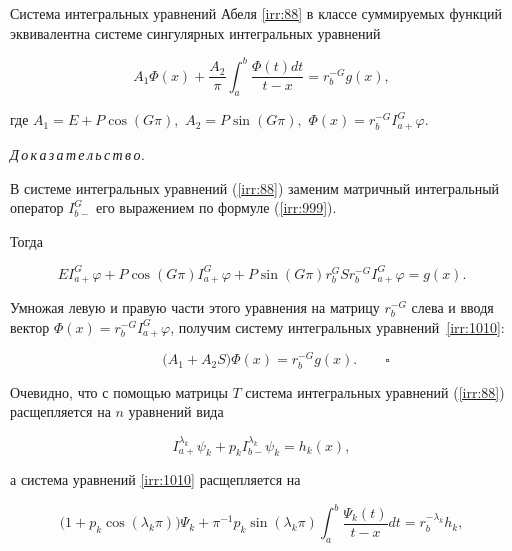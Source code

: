 \smallskip



\begin{lemma}[2]Система интегральных уравнений Абеля \eqref{irr:88} в классе суммируемых функций эквивалентна системе сингулярных интегральных уравнений

\begin{equation}\label{irr:1010}

A_{1}\Phi(x)+\frac{A_{2}}{\pi}\int _{a}^{b}\frac{\Phi(t)dt}{t-x}=r_b^{-G}g(x),

\end{equation}

где $A_{1}=E+P\cos(G\pi),$ $A_{2}=P\sin(G\pi),$ $\Phi(x)=r_b^{-G}I_{a+}^{G}\varphi$.

\end{lemma}



{\it Д\,о\,к\,а\,з\,а\,т\,е\,л\,ь\,с\,т\,в\,о.}

В системе интегральных уравнений (\ref{irr:88}) заменим матричный интегральный оператор $I_{b-}^{G}$ его выражением по формуле (\ref{irr:999}).

Тогда

$$EI_{a+}^{G}\varphi+P\cos(G\pi)I_{a+}^{G}\varphi+P\sin(G\pi)r_{b}^{G}Sr_{b}^{-G}I_{a+}^{G}\varphi=g(x).$$

Умножая левую и правую части этого уравнения на матрицу $r_{b}^{-G}$ слева и вводя вектор $\Phi(x)=r_{b}^{-G}I_{a+}^{G}\varphi$, получим систему интегральных уравнений~\eqref{irr:1010}:

$$

\qquad \bigl(A_1 +A_2 S\bigr)\Phi(x)=r_{b}^{-G}g(x). \qquad \square$$





Очевидно, что с помощью матрицы $T$ система интегральных уравнений (\ref{irr:88}) расщепляется на $n$ уравнений вида

\begin{equation}\label{irr:1111}

I_{a+}^{\lambda_{k}}\psi_{k}+p_{k}I_{b-}^{\lambda_{k}}\psi_{k}=h_{k}(x),

\end{equation}

а система уравнений \eqref{irr:1010} расщепляется на 

\begin{equation}\label{irr:12}

\bigl(1+p_{k}\cos(\lambda_{k}\pi)\bigr)\Psi_{k}+{\pi}^{-1}p_{k}\sin(\lambda_{k}\pi)\int _{a}^{b}\frac{\Psi_{k}(t)}{t-x} dt =r_b^{-\lambda_{k}}h_{k},

\end{equation}

